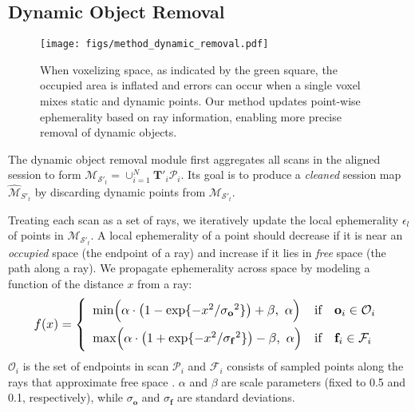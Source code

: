 \subsection{Dynamic Object Removal}
\label{subsec:dynamic_removal}

\begin{figure}[!t]
    \centering
    \texttt{[image: figs/method\_dynamic\_removal.pdf]}
    \caption{When voxelizing space, as indicated by the green square, the occupied area is inflated and errors can occur when a single voxel mixes static and dynamic points. Our method updates point-wise ephemerality based on ray information, enabling more precise removal of dynamic objects.}
    \label{fig:method_dynamic}
    \vspace{-3mm}
\end{figure}

The dynamic object removal module first aggregates all scans in the aligned session to form \(\mathcal{M}_{\mathcal{S}'_{t}} = \cup_{i=1}^{N} \mathbf{T}'_i \mathcal{P}_i\). Its goal is to produce a \emph{cleaned} session map \( \hat{\mathcal{M}}_{S'_t} \) by discarding dynamic points from \(\mathcal{M}_{\mathcal{S}'_{t}}\).

Treating each scan as a set of rays, we iteratively update the local ephemerality $\epsilon_{l}$ of points in \(\mathcal{M}_{\mathcal{S}'_{t}}\).  
A local ephemerality of a point should decrease if it is near an \emph{occupied} space (the endpoint of a ray) and increase if it lies in \emph{free} space (the path along a ray).
We propagate ephemerality across space by modeling a function of the distance $x$ from a ray:
\begin{equation}
\resizebox{0.91\linewidth}{!}{$
f(x)= \left\{
\begin{array}{lll}
\min \Bigl(\alpha \cdot \bigl(1 - \exp\{-x^2/{\sigma_\mathbf{o}}^2\}\bigr) + \beta,\ \alpha\Bigr) 
& \text{if} & \mathbf{o}_i \in \mathcal{O}_i \\[7pt]
\max \Bigl(\alpha \cdot \bigl(1 + \exp\{-x^2/{\sigma_\mathbf{f}}^2\}\bigr) - \beta,\ \alpha\Bigr) 
& \text{if} & \mathbf{f}_i \in \mathcal{F}_i \\
\end{array}
\right.
$}
\label{eq:5}
\end{equation}
\(\mathcal{O}_i\) is the set of endpoints in scan \(\mathcal{P}_i\) and \(\mathcal{F}_i\) consists of sampled points along the rays that approximate free space \cite{zhong2023shine}. 
\(\alpha\) and \(\beta\) are scale parameters (fixed to 0.5 and 0.1, respectively), while \(\sigma_{\mathbf{o}}\) and \(\sigma_{\mathbf{f}}\) are standard deviations.

